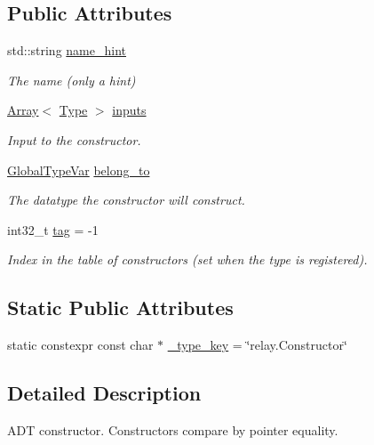 \subsection*{Public Attributes}
\begin{DoxyCompactItemize}
\item 
std\+::string \hyperlink{classtvm_1_1ConstructorNode_a4bc169a07961c92da7ee35a5cebdf209}{name\+\_\+hint}
\begin{DoxyCompactList}\small\item\em The name (only a hint) \end{DoxyCompactList}\item 
\hyperlink{classtvm_1_1Array}{Array}$<$ \hyperlink{classtvm_1_1Type}{Type} $>$ \hyperlink{classtvm_1_1ConstructorNode_a5e999221d27a09f0ae69fd94674349b1}{inputs}
\begin{DoxyCompactList}\small\item\em Input to the constructor. \end{DoxyCompactList}\item 
\hyperlink{classtvm_1_1GlobalTypeVar}{Global\+Type\+Var} \hyperlink{classtvm_1_1ConstructorNode_a671fab9e6add1be16eca6e19efac99c5}{belong\+\_\+to}
\begin{DoxyCompactList}\small\item\em The datatype the constructor will construct. \end{DoxyCompactList}\item 
int32\+\_\+t \hyperlink{classtvm_1_1ConstructorNode_a396a76459b3a46eefdfcd952c69c5ee4}{tag} = -\/1
\begin{DoxyCompactList}\small\item\em Index in the table of constructors (set when the type is registered). \end{DoxyCompactList}\end{DoxyCompactItemize}
\subsection*{Static Public Attributes}
\begin{DoxyCompactItemize}
\item 
static constexpr const char $\ast$ \hyperlink{classtvm_1_1ConstructorNode_a41f40e2a99b4f65659a17b62294539fd}{\+\_\+type\+\_\+key} = \char`\"{}relay.\+Constructor\char`\"{}
\end{DoxyCompactItemize}


\subsection{Detailed Description}
A\+DT constructor. Constructors compare by pointer equality. 

